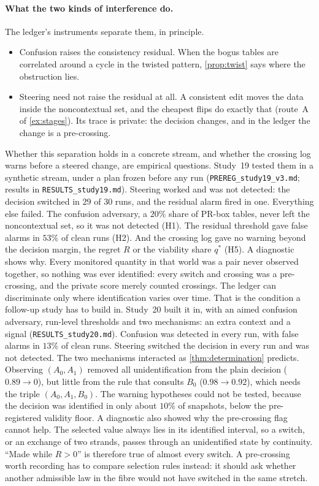 \documentclass[11pt]{article}
\theoremstyle{definition}\newtheorem{definition}[theorem]{Definition}\newtheorem{remark}[theorem]{Remark}\newtheorem{example}[theorem]{Example}\newtheorem{problem}[theorem]{Open problem}\crefname{problem}{Problem}{Problems}
\begin{document}
\paragraph{What the two kinds of interference do.} The ledger's instruments separate them, in principle.
\begin{itemize}
\item Confusion raises the consistency residual. When the bogus tables are correlated around a cycle in the twisted pattern, \cref{prop:twist} says where the obstruction lies.
\item Steering need not raise the residual at all. A consistent edit moves the data inside the noncontextual set, and the cheapest
flips do exactly that (route~A of \cref{ex:stages}). Its trace is private: the decision changes, and in the ledger the change is a
pre-crossing.
\end{itemize}
Whether this separation holds in a concrete stream, and whether the crossing log warns before a steered change, are empirical
questions. Study~19 tested them in a synthetic stream, under a plan frozen before any run (\texttt{PREREG\_study19\_v3.md}; results in \texttt{RESULTS\_study19.md}). Steering worked and was not detected: the decision switched in $29$ of $30$ runs, and the residual alarm fired in one. Everything else failed. The confusion adversary, a $20\%$ share of PR-box tables, never left the noncontextual set, so it was not detected (H1). The residual threshold gave false alarms in $53\%$ of clean runs (H2). And the crossing log gave no warning beyond the decision margin, the regret $R$ or the viability share $q^*$ (H5). A diagnostic shows why. Every monitored quantity in that world was a pair never observed together, so nothing was ever identified: every switch and crossing was a pre-crossing, and the private score merely counted crossings. The ledger can discriminate only where identification varies over time. That is the condition a follow-up study has to build in. Study~20 built it in, with an aimed confusion adversary, run-level thresholds and two mechanisms: an extra context and a signal (\texttt{RESULTS\_study20.md}). Confusion was detected in every run, with false alarms in $13\%$ of clean runs. Steering switched the decision in every run and was not detected. The two mechanisms interacted as \cref{thm:determination} predicts. Observing $(A_0,A_1)$ removed all unidentification from the plain decision ($0.89\to0$), but little from the rule that consults $B_0$ ($0.98\to0.92$), which needs the triple $(A_0,A_1,B_0)$. The warning hypotheses could not be tested, because the decision was identified in only about $10\%$ of snapshots, below the pre-registered validity floor. A diagnostic also showed why the pre-crossing flag cannot help. The selected value always lies in its identified interval, so a switch, or an exchange of two strands, passes through an unidentified state by continuity. ``Made while $R>0$'' is therefore true of almost every switch. A pre-crossing worth recording has to compare selection rules instead: it should ask whether another admissible law in the fibre would not have switched in the same stretch.
\end{document}
